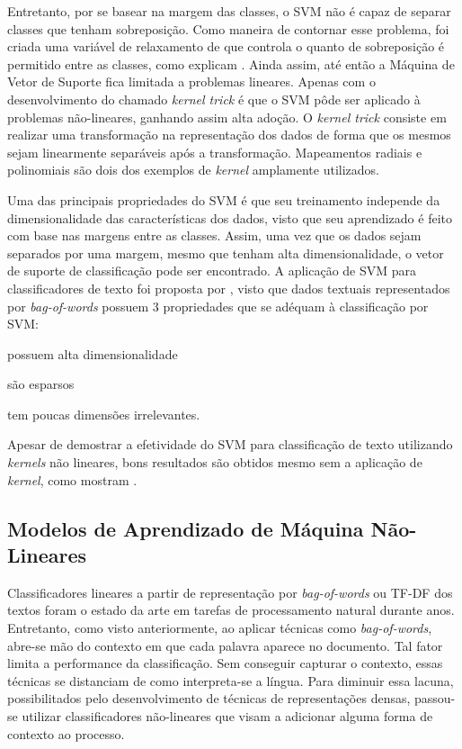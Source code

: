 Entretanto, por se basear na margem das classes, o SVM não é capaz de separar
classes que tenham sobreposição.
Como maneira de contornar esse problema, foi criada uma variável de relaxamento de
que controla o quanto de sobreposição é permitido entre as classes, como
explicam \citet{cortes95}.
Ainda assim, até então a Máquina de Vetor de Suporte fica limitada a problemas
lineares.
Apenas com o desenvolvimento do chamado \textit{kernel trick} é que o SVM pôde ser
aplicado à problemas não-lineares, ganhando assim alta adoção.
O \textit{kernel trick} consiste em realizar uma transformação na representação
dos dados de forma que os mesmos sejam linearmente separáveis após a
transformação.
Mapeamentos radiais e polinomiais são dois dos exemplos de \textit{kernel}
amplamente utilizados.

Uma das principais propriedades do SVM é que seu treinamento independe da
dimensionalidade das características dos dados, visto que seu aprendizado é feito
com base nas margens entre as classes.
Assim, uma vez que os dados sejam separados por uma margem, mesmo que tenham
alta dimensionalidade, o vetor de suporte de classificação pode ser encontrado.
A aplicação de SVM para classificadores de texto foi proposta por
\citet{joachims98}, visto que dados textuais representados por
\textit{bag-of-words} possuem 3 propriedades que se adéquam à classificação por
SVM:
\begin {enumerate*} [label=\itshape\alph*\upshape)]
    \item possuem alta dimensionalidade
    \item são esparsos
    \item tem poucas dimensões irrelevantes.
\end {enumerate*}
Apesar de \citet{joachims98} demostrar a efetividade do SVM para classificação
de texto utilizando \textit{kernels} não lineares, bons resultados são obtidos
mesmo sem a aplicação de \textit{kernel}, como mostram \citet{pang02}.

\subsection{Modelos de Aprendizado de Máquina Não-Lineares}

Classificadores lineares a partir de representação por \textit{bag-of-words} ou
TF-DF dos textos foram o estado da arte em tarefas de processamento natural
durante anos.
Entretanto, como visto anteriormente, ao aplicar técnicas como
\textit{bag-of-words}, abre-se mão do contexto em que cada palavra aparece no
documento.
Tal fator limita a performance da classificação.
Sem conseguir capturar o contexto, essas técnicas se distanciam de como
interpreta-se a língua.
Para diminuir essa lacuna, possibilitados pelo desenvolvimento de técnicas de
representações densas, passou-se utilizar classificadores não-lineares que
visam a adicionar alguma forma de contexto ao processo.

